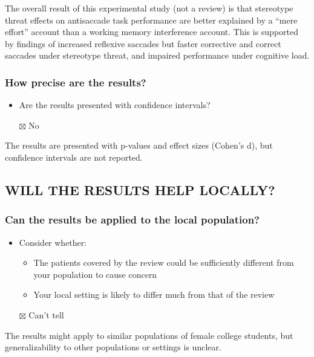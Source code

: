 \documentclass[
  doc, a4paper]{apa7}
\providecommand{\tightlist}{%
  \setlength{\itemsep}{0pt}\setlength{\parskip}{0pt}}
\begin{document}
The overall result of this experimental study (not a review) is that stereotype threat effects on antisaccade task performance are better explained by a ``mere effort'' account than a working memory interference account. This is supported by findings of increased reflexive saccades but faster corrective and correct saccades under stereotype threat, and impaired performance under cognitive load.

\subsubsection{How precise are the results?}\label{how-precise-are-the-results}

\begin{itemize}
\tightlist
\item
  Are the results presented with confidence intervals?
\item[$\boxtimes$]
  No
\end{itemize}

The results are presented with p-values and effect sizes (Cohen's d), but confidence intervals are not reported.

\subsection{WILL THE RESULTS HELP LOCALLY?}\label{will-the-results-help-locally}

\subsubsection{Can the results be applied to the local population?}\label{can-the-results-be-applied-to-the-local-population}

\begin{itemize}
\tightlist
\item
  Consider whether:

  \begin{itemize}
  \tightlist
  \item
    The patients covered by the review could be sufficiently different from your population to cause concern
  \item
    Your local setting is likely to differ much from that of the review
  \end{itemize}
\item[$\boxtimes$]
  Can't tell
\end{itemize}

The results might apply to similar populations of female college students, but generalizability to other populations or settings is unclear.
\end{document}
